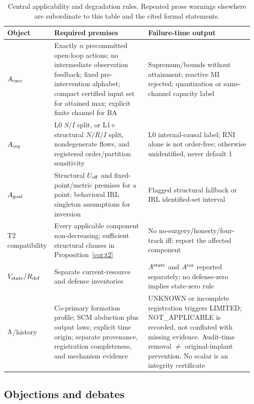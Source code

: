 \begin{table}[htbp]
\centering
\caption{Central applicability and degradation rules. Repeated prose warnings
elsewhere are subordinate to this table and the cited formal statements.}
\label{tab:degradation}
\footnotesize
\begin{tabularx}{\textwidth}{@{}>{\raggedright\arraybackslash}p{}
>{\raggedright\arraybackslash}p{}X@{}}
\toprule
Object & Required premises & Failure-time output \\
\midrule
$A_{\mathrm{exec}}$ & Exactly $n$ precommitted open-loop actions; no intermediate
observation feedback; fixed pre-intervention alphabet; compact certified input
set for attained max; explicit finite channel for BA & Supremum/bounds without
attainment; reactive MI rejected; quantization or same-channel capacity label \\
$A_{\mathrm{org}}$ & L0 $S/I$ split, or L1+ structural $N/R/I$ split, nondegenerate
flows, and registered order/partition sensitivity & L0 internal-causal label;
RNI alone is not order-free; otherwise unidentified, never default 1 \\
$A_{\mathrm{goal}}$ & Structural $U_{\mathrm{eff}}$ and fixed-point/metric premises for a point;
behavioral IRL singleton assumptions for inversion & Flagged structural
fallback or IRL identified-set interval \\
T2 compatibility & Every applicable component non-decreasing; sufficient
structural clauses in Proposition~\ref{cor:t2} & No no-surgery/honesty/four-track
iff; report the affected component \\
$V_{\mathrm{state}}/R_{\mathrm{def}}$ & Separate current-resource and defense inventories & $A^{\mathrm{state}}$
and $A^{\mathrm{res}}$ reported separately; no defense-zero implies state-zero rule \\
$\Lambda$/history & Co-primary formation profile; SCM abduction plus output laws;
explicit time origin; separate provenance, registration completeness, and
mechanism evidence & UNKNOWN or incomplete registration triggers LIMITED;
NOT\_APPLICABLE is recorded, not conflated with missing evidence. Audit-time
removal $\neq$ original-implant prevention. No scalar is an integrity certificate \\
\bottomrule
\end{tabularx}
\end{table}

\subsection{Objections and debates}\label{sec:objections}

